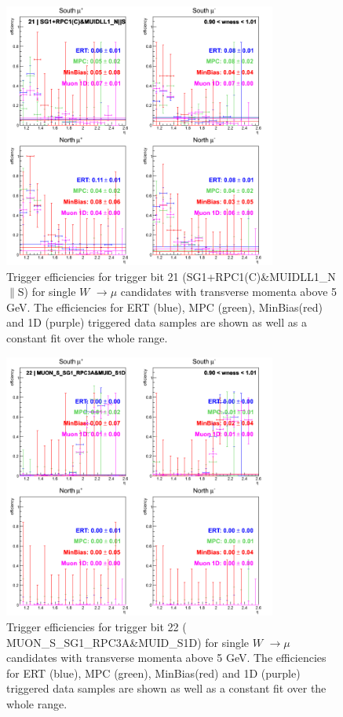 \clearpage
\begin{figure}[h!]

  \centering

  \includegraphics[width=0.8\textwidth]{./figures/run13_trigeffieta_w1_trig21_lin.png}
  \caption{\label{fig:run13_trigeffieta_w0_nper0_trig21_lin} Trigger efficiencies for trigger bit 21 (SG1+RPC1(C)\&MUIDLL1\_N$\|$S) for single $W$ $\rightarrow \mu$ candidates with transverse momenta above 5 GeV. The efficiencies for ERT (blue), MPC (green), MinBias(red) and 1D (purple) triggered data samples are shown as well as a constant fit over the whole range.}

\end{figure}
\clearpage
\begin{figure}[h!]

  \centering

  \includegraphics[width=0.8\textwidth]{./figures/run13_trigeffieta_w1_trig22_lin.png}
  \caption{\label{fig:run13_trigeffieta_w0_nper0_trig22_lin} Trigger efficiencies for trigger bit 22 ( MUON\_S\_SG1\_RPC3A\&MUID\_S1D) for single $W$ $\rightarrow \mu$ candidates with transverse momenta above 5 GeV. The efficiencies for ERT (blue), MPC (green), MinBias(red) and 1D (purple) triggered data samples are shown as well as a constant fit over the whole range.}

\end{figure}
